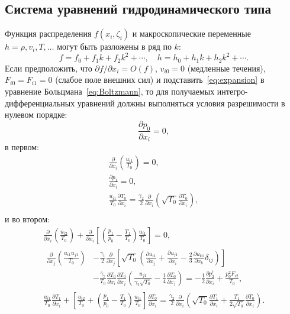 \documentclass[
aps,%
12pt,%
final,%
notitlepage,%
oneside,%
onecolumn,%
nobibnotes,%
nofootinbib,%
superscriptaddress,%
noshowpacs,%
showkeys,%
centertags]%
{revtex4}
\newcommand{\pder}[2][]{\frac{\partial#1}{\partial#2}}
\newcommand{\Pder}[2][]{\partial#1/\partial#2}
\newcommand{\OO}[1]{O(#1)}
\begin{document}
\subsection{Система уравнений гидродинамического типа}

Функция распределения \(f(x_i,\zeta_i)\) и макроскопические переменные \(h = \rho, v_i, T, \dots\)
могут быть разложены в ряд по \(k\):
\begin{equation}\label{eq:expansion}
    f = f_0 + f_1k + f_2k^2 + \cdots, \quad h = h_0 + h_1k + h_2k^2 + \cdots.
\end{equation}
Если предположить, что \(\Pder[f]{x_i} = \OO{f}\),
\(v_{i0} = 0\) (медленные течения), \(F_{i0} = F_{i1} = 0\) (слабое поле внешних сил)
и подставить~\eqref{eq:expansion} в уравнение Больцмана~\eqref{eq:Boltzmann},
то для получаемых интегро-дифференциальных уравнений должны выполняться
условия разрешимости в нулевом порядке:
\begin{equation}
    \pder[p_0]{x_i} = 0, \label{eq:asymptotic0_p}
\end{equation}
в первом:
\begin{gather}
    \pder{x_i}\left(\frac{u_{i1}}{T_0}\right) = 0, \label{eq:asymptotic1_u} \\
    \pder[p_1]{x_i} = 0, \label{eq:asymptotic1_p} \\
    \frac{u_{i1}}{T_0}\pder[T_0]{x_i}
        = \frac{\gamma_2}2\pder{x_i}\left(\sqrt{T_0}\pder[T_0]{x_i}\right), \label{eq:asymptotic1_T} \\
\end{gather}
и во втором:
\begin{gather}
    \pder{x_i}\left(\frac{u_{i2}}{T_0}\right)
        + \pder{x_i}\left[\left(\frac{p_1}{p_0}-\frac{T_1}{T_0}\right)\frac{u_{i1}}{T_0}\right] = 0, \label{eq:asymptotic2_u} \\
    \begin{aligned}
    \pder{x_j}\left(\frac{u_{i1}u_{j1}}{T_0}\right)
        &-\frac{\gamma_1}2\pder{x_j}\left[\sqrt{T_0}\left(
            \pder[u_{i1}]{x_j} + \pder[u_{j1}]{x_i} - \frac23\pder[u_{k1}]{x_k}\delta_{ij}
        \right)\right] \\
        &- \frac{\bar{\gamma}_7}{T_0}\pder[T_0]{x_i}\pder[T_0]{x_j}\left(\frac{u_{j1}}{\gamma_2\sqrt{T_0}} - \frac{1}4\pder[T_0]{x_j}\right)
        = -\frac12\pder[p_2^\dag]{x_i} + \frac{p_0^2 F_{i2}}{T_0},
    \end{aligned} \label{eq:asymptotic2_p} \\
    \frac{u_{i1}}{T_0}\pder[T_1]{x_i}
        + \left[\frac{u_{i2}}{T_0} + \left(\frac{p_1}{p_0}-\frac{T_1}{T_0}\right)\frac{u_{i1}}{T_0}\right]\pder[T_0]{x_i}
        = \frac{\gamma_2}2\pder{x_i}\left(\sqrt{T_0}\pder[T_1]{x_i} + \frac{T_1}{2\sqrt{T_0}}\pder[T_0]{x_i}\right). \label{eq:asymptotic2_T}
\end{gather}
\end{document}
